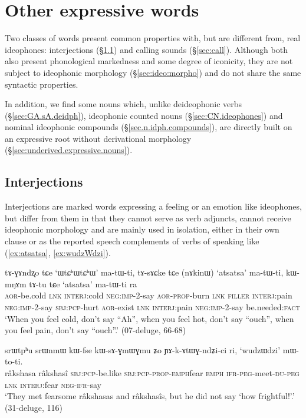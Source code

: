 \section{Other expressive words} \label{sec:other.expressive}
Two classes of words present common properties with, but are different from, real ideophones: interjections (§\ref{sec:interjections}) and calling sounds (§\ref{sec:call}). Although both also present phonological markedness and some degree of iconicity, they are not subject to ideophonic morphology (§\ref{sec:ideo:morpho}) and do not share the same syntactic properties. 

In addition, we find some nouns which, unlike deideophonic verbs (§\ref{sec:GA.sA.deidph}), ideophonic counted nouns (§\ref{sec:CN.ideophones}) and nominal ideophonic compounds (§\ref{sec.n.idph.compounds}), are directly built on an expressive root without derivational morphology (§\ref{sec:underived.expressive.nouns}).

 
\subsection{Interjections} \label{sec:interjections}
 Interjections are marked words expressing a feeling or an emotion like ideophones, but differ from them in that they cannot serve as verb adjuncts, cannot receive ideophonic morphology and are mainly used in isolation, either in their own clause or as the reported speech complements of verbs of speaking like  (\ref{ex:atsatsa}, \ref{ex:wudzWdzi}). 
 
\begin{exe}
\ex \label{ex:atsatsa}
\gll tɤ-ɣɤndʐo tɕe `ɯtɕʰɯtɕʰɯ' ma-tɯ-ti,   tɤ-sɤɕke tɕe (nɤkinɯ) `atsatsa' ma-tɯ-ti, kɯ-mŋɤm tɤ-tu tɕe `atsatsa' ma-tɯ-ti ra  \\
 	\textsc{aor}-be.cold \textsc{lnk} \textsc{interj}:cold \textsc{neg}:\textsc{imp}-2-say \textsc{aor}-\textsc{prop}-burn \textsc{lnk} \textsc{filler} \textsc{interj}:pain \textsc{neg}:\textsc{imp}-2-say \textsc{sbj}:\textsc{pcp}-hurt \textsc{aor}-exist \textsc{lnk} \textsc{interj}:pain \textsc{neg}:\textsc{imp}-2-say be.needed:\textsc{fact} 	\\
\glt `When you feel cold, don't say ``Ah'', when you feel hot, don't say ``ouch'', when you  feel pain, don't say ``ouch''.' (07-deluge, 66-68)
\end{exe}

\begin{exe}
\ex \label{ex:wudzWdzi}
\gll srɯtpʰu srɯnmɯ kɯ-fse kɯ-sɤ-ɣmɯ\redp{}ɣmu ʑo ɲɤ-k-ɤtɯɣ-ndʑi-ci ri,  `wudzɯdzi' mɯ-to-ti. \\
râkshasa râkshasî \textsc{sbj}:\textsc{pcp}-be.like \textsc{sbj}:\textsc{pcp}-\textsc{prop}-\textsc{emph}\redp{}fear \textsc{emph} \textsc{ifr}-\textsc{peg}-meet-\textsc{du}-\textsc{peg} \textsc{lnk} \textsc{interj}:fear \textsc{neg}-\textsc{ifr}-say \\
\glt `They met fearsome râkshasas and râkshasîs, but he did not say `how frightful!'.' (31-deluge, 116)
\end{exe}
 

